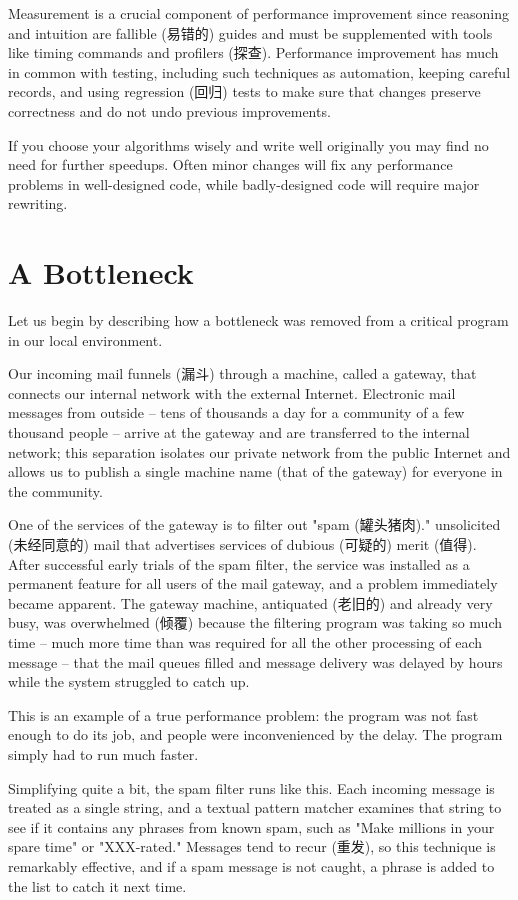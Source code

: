 Measurement is a crucial component of performance improvement since
reasoning and intuition are fallible (易错的) guides and must be
supplemented with tools like timing commands and profilers (探查).
Performance improvement has much in common with testing, including such
techniques as automation, keeping careful records, and using regression
(回归) tests to make sure that changes preserve correctness and do not undo
previous improvements.

If you choose your algorithms wisely and write well originally you may find
no need for further speedups. Often minor changes will fix any performance
problems in well-designed code, while badly-designed code will require
major rewriting.

\section{A Bottleneck}
\label{sec:bootleneck}
Let us begin by describing how a bottleneck was removed from a critical
program in our local environment.

Our incoming mail funnels (漏斗) through a machine, called a gateway, that
connects our internal network with the external Internet. Electronic mail
messages from outside -- tens of thousands a day for a community of a few
thousand people -- arrive at the gateway and are transferred to the
internal network; this separation isolates our private network from the
public Internet and allows us to publish a single machine name (that of the
gateway) for everyone in the community.

One of the services of the gateway is to filter out "spam (罐头猪肉)."
unsolicited (未经同意的) mail that advertises services of dubious (可疑的)
merit (值得). After successful early trials of the spam filter, the service
was installed as a permanent feature for all users of the mail gateway, and
a problem immediately became apparent. The gateway machine, antiquated
(老旧的) and already very busy, was overwhelmed (倾覆) because the
filtering program was taking so much time -- much more time than was
required for all the other processing of each message -- that the mail
queues filled and message delivery was delayed by hours while the system
struggled to catch up.

This is an example of a true performance problem: the program was not fast
enough to do its job, and people were inconvenienced by the delay. The
program simply had to run much faster.

Simplifying quite a bit, the spam filter runs like this. Each incoming
message is treated as a single string, and a textual pattern matcher
examines that string to see if it contains any phrases from known spam,
such as "Make millions in your spare time" or "XXX-rated." Messages tend to
recur (重发), so this technique is remarkably effective, and if a spam
message is not caught, a phrase is added to the list to catch it next time.

